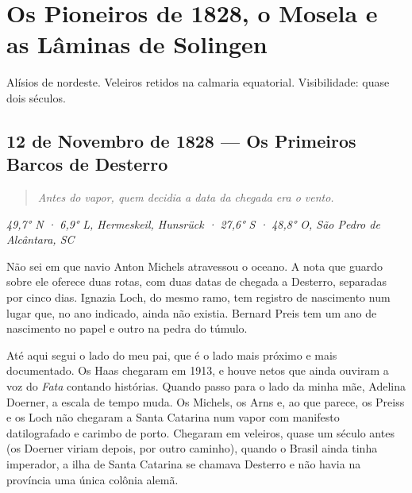 \documentclass[
  brazilian,
  11pt,
  openany]{book}
\newenvironment{boletim}{\begin{center}\begin{minipage}{0.85\linewidth}\small\itshape}{\end{minipage}\end{center}}
\begin{document}
\part{Os Pioneiros de 1828, o Mosela e as Lâminas de
Solingen}\label{os-pioneiros-de-1828-o-mosela-e-as-luxe2minas-de-solingen}

\begin{boletim}

Alísios de nordeste. Veleiros retidos na calmaria equatorial.
Visibilidade: quase dois séculos.

\end{boletim}

\chapter{12 de Novembro de 1828 --- Os Primeiros Barcos de
Desterro}\label{cap-8}

\begin{quote}
\emph{Antes do vapor, quem decidia a data da chegada era o vento.}
\end{quote}

\emph{49,7° N · 6,9° L, Hermeskeil, Hunsrück · 27,6° S · 48,8° O, São
Pedro de Alcântara, SC}

Não sei em que navio Anton Michels atravessou o oceano. A nota que
guardo sobre ele oferece duas rotas, com duas datas de chegada a
Desterro, separadas por cinco dias. Ignazia Loch, do mesmo ramo, tem
registro de nascimento num lugar que, no ano indicado, ainda não
existia. Bernard Preis tem um ano de nascimento no papel e outro na
pedra do túmulo.

Até aqui segui o lado do meu pai, que é o lado mais próximo e mais
documentado. Os Haas chegaram em 1913, e houve netos que ainda ouviram a
voz do \emph{Fata} contando histórias. Quando passo para o lado da minha
mãe, Adelina Doerner, a escala de tempo muda. Os Michels, os Arns e, ao
que parece, os Preiss e os Loch não chegaram a Santa Catarina num vapor
com manifesto datilografado e carimbo de porto. Chegaram em veleiros,
quase um século antes (os Doerner viriam depois, por outro caminho),
quando o Brasil ainda tinha imperador, a ilha de Santa Catarina se
chamava Desterro e não havia na província uma única colônia alemã.
\end{document}
